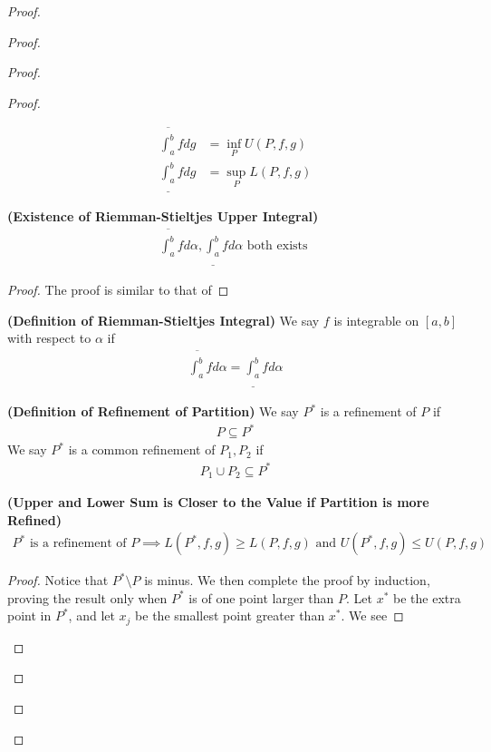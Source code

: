 \documentclass{report}
\begin{document}
\begin{proof}
\begin{proof}
\begin{proof}
\begin{proof}
\begin{definition}
\begin{align*}
\overline{\int_a^b} fdg&=\inf_P U(P,f,g)\\
\underline{\int_a^b}fdg&=\sup_P L(P,f,g)
\end{align*}
\end{definition}
\begin{theorem}
\label{7.1.9}
\textbf{(Existence of Riemman-Stieltjes Upper Integral)} 
\begin{align*}
\overline{\int_a^b}fd\alpha, \underline{\int_a^b}fd\alpha \text{ both exists }
\end{align*}
\end{theorem}
\begin{proof}
The proof is similar to that of 
\end{proof}
\begin{definition}
\label{7.1.10}
\textbf{(Definition of Riemman-Stieltjes Integral)} We say $f$ is integrable on $[a,b]$ with respect to $\alpha $ if 
\begin{align*}
\overline{\int_a^b}fd\alpha =\underline{\int_a^b}fd\alpha 
\end{align*}
\end{definition}
\begin{definition}
\label{7.1.11}
\textbf{(Definition of Refinement of Partition)} We say $P^*$ is a  refinement of $P$ if 
 \begin{align*}
P\subseteq P^*
\end{align*}
We say  $P^*$ is a common refinement of $P_1,P_2$ if 
 \begin{align*}
P_1\cup P_2 \subseteq P^*
\end{align*}
\end{definition}
\begin{theorem}
\label{7.1.12}
\textbf{(Upper and Lower Sum is Closer to the Value if Partition is more Refined)} 
\begin{align*}
  P^*\text{ is a refinement of }P\implies L(P^*,f,g)\geq L(P,f,g)\text{ and }U(P^*,f,g)\leq U(P,f,g)
\end{align*}
\end{theorem}
\begin{proof}
Notice that $P^*\setminus P$ is minus. We then complete the proof by induction, proving the result only when $P^*$ is of one point larger than $P$. Let $x^*$ be the extra point in  $P^*$, and let  $x_j$ be the smallest point greater than  $x^*$.  We see 

\end{proof}
\end{proof}
\end{proof}
\end{proof}
\end{proof}
\end{document}
